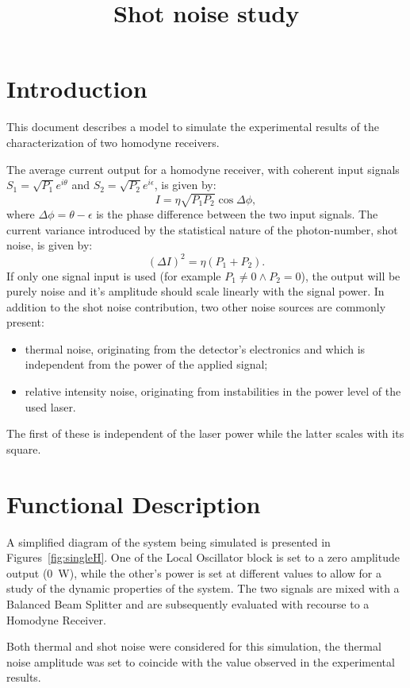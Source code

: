 \documentclass[a4paper]{article}
\title{Shot noise study}
\author{}
\date{}
\begin{document}
\maketitle

\section{Introduction}\label{sec:intro}

This document describes a model to simulate the experimental results of the characterization of two homodyne receivers.
\par
The average current output for a homodyne receiver, with coherent input signals $S_1=\sqrt{P_1}e^{i\theta}$ and $S_2=\sqrt{P_2}e^{i\epsilon}$, is given by:
\begin{equation}
I=\eta\sqrt{P_1P_2}\cos\Delta\phi,
\end{equation}
where $\Delta\phi=\theta-\epsilon$ is the phase difference between the two input signals. The current variance introduced by the statistical nature of the photon-number, shot noise, is given by:
\begin{equation}
(\Delta I)^2=\eta(P_1+P_2).
\end{equation}
If only one signal input is used (for example $P_1\neq0\wedge P_2=0$), the output will be purely noise and it's amplitude should scale linearly with the signal power. In addition to the shot noise contribution, two other noise sources are commonly present: 
\begin{itemize}
\item thermal noise, originating from the detector’s electronics and which is independent from the power of the applied signal;
\item relative intensity noise, originating from instabilities in the power level of the used laser.
\end{itemize}
The first of these is independent of the laser power while the latter scales with its square.

\section{Functional Description}

A simplified diagram of the system being simulated is presented in Figures~\ref{fig:singleH}. One of the Local Oscillator block is set to a zero amplitude output (0~W), while the other's power is set at different values to allow for a study of the dynamic properties of the system. The two signals are mixed with a Balanced Beam Splitter and are subsequently evaluated with recourse to a Homodyne Receiver.
\par
Both thermal and shot noise were considered for this simulation, the thermal noise amplitude was set to coincide with the value observed in the experimental results.
\end{document}
